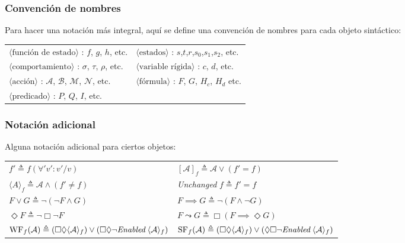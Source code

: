 \subsubsection{Convención de nombres}
\noindent
Para hacer una notación más integral, aquí se define una convención de nombres para cada objeto sintáctico:
\vspace{0.2cm}
\newline
\begin{tabular}{ll}
  $\langle \text{función de estado} \rangle$ : $f$, $g$, $h$, etc. & $\langle \text{estados} \rangle$ : $s$,$t$,$r$,$s_0$,$s_1$,$s_2$, etc. \\
  $\langle \text{comportamiento} \rangle$ : $\sigma$, $\tau$, $\rho$, etc. & $\langle \text{variable rígida} \rangle$ : $c$, $d$, etc.\\
  $\langle \text{acción} \rangle$ : $\mathcal{A}$, $\mathcal{B}$, $\mathcal{M}$, $\mathcal{N}$, etc. & $\langle \text{fórmula} \rangle$ : $F$, $G$, $H_c$, $H_d$ etc.\\
  $\langle \text{predicado} \rangle$ : $P$, $Q$, $I$, etc. \\
\end{tabular}

\subsubsection{Notación adicional}
\noindent
Alguna notación adicional para ciertos objetos:
\vspace{0.2cm}
\newline
\begin{tabular}{ll}
  $f' \triangleq f(\forall 'v' : v' / v)$ & $[\mathcal{A}]_f \triangleq \mathcal{A} \lor (f' = f)$ \\ 
  $\langle A \rangle_f \triangleq \mathcal{A} \land (f' \neq f)$ & \textit{Unchanged} $f \triangleq f' = f$\\
  $F \lor G \triangleq \neg(\neg F \land G)$ & $F \implies G \triangleq \neg(F \land \neg G)$\\
  $\Diamond F \triangleq \neg \Box \neg F$ & $F \leadsto G \triangleq \Box(F \implies \Diamond G)$\\
  $\text{WF}_f(\mathcal{A}) \triangleq (\Box\Diamond \langle \mathcal{A}\rangle_f) \lor (\Box\Diamond \neg \textit{Enabled} \hspace{0.1cm} \langle \mathcal{A}\rangle_f)$ & $\text{SF}_f(\mathcal{A}) \triangleq (\Box\Diamond \langle \mathcal{A}\rangle_f) \lor (\Diamond\Box \neg \textit{Enabled} \hspace{0.1cm} \langle \mathcal{A}\rangle_f)$  \\
\end{tabular}

